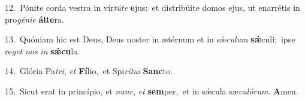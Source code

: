 {\numbfont\textcolor{\numbcolor}{12.}}~Pónite corda vestra in vir\-\textit{tú}\-\textit{te} \textbf{e}\-jus:~\star et distribúite domos ejus, ut enarrétis in pro\-\textit{gé}\-\textit{ni}\textit{e} \textbf{ál}\-\textbf{te}ra.\par
{\numbfont\textcolor{\numbcolor}{13.}}~Quóniam hic est Deus, Deus noster in ætérnum et in sǽ\-\textit{cu}\-\textit{lum} \textbf{sǽ}\-culi:~\star ipse re\textit{get} \textit{nos} \textit{in} \textbf{sǽ}\-\textbf{cu}la.\par
{\numbfont\textcolor{\numbcolor}{14.}}~Glória Pa\-\textit{tri}\-, \textit{et} \textbf{Fí}\-lio,~\star et Spi\-\textit{rí}\-\textit{tu}\textit{i} \textbf{Sanc}\-to.\par
{\numbfont\textcolor{\numbcolor}{15.}}~Sicut erat in princípio, et \textit{nunc}\-, \textit{et} \textbf{sem}\-per,~\star et in sǽcula sæ\-\textit{cu}\-\textit{ló}\textit{rum}. \textbf{A}\-men.\par
